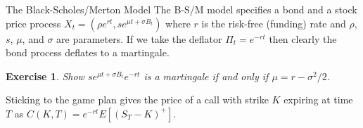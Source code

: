 \documentclass[fleqn]{amsart}
\newtheorem{exercise}{Exercise}
\begin{document}
\begin{section}{The Black-Scholes/Merton Model}
The B-S/M model specifies a bond and a stock price process $X_t = (\rho
e^{rt}, se^{\mu t + \sigma B_t})$ where $r$ is the risk-free (funding)
rate and $\rho$, $s$, $\mu$, and $\sigma$ are parameters. If we take the
deflator $\Pi_t = e^{-rt}$ then clearly the bond process deflates to
a martingale.

\begin{exercise}
Show $se^{\mu t + \sigma B_t} e^{-rt}$ is a martingale if and only
if $\mu = r - \sigma^2/2$.
\end{exercise}

Sticking to the game plan gives the price of a call with strike
$K$ expiring at time $T$ as $C(K,T) = e^{-rt}E[(S_T - K)^+]$.

\end{section}
\end{document}
